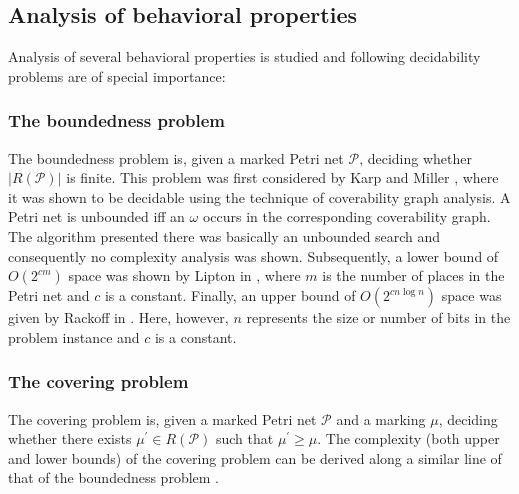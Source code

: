 \subsection{Analysis of behavioral properties} %
\label{sub:analysis_of_behavioral_properties}

Analysis of several behavioral properties is studied and following decidability problems are of special importance:

\subsubsection{The boundedness problem} %
\label{ssub:the_boundedness_problem}
  The boundedness problem is, given a marked Petri net $\mathcal P$, deciding whether $|R(\mathcal P)|$ is finite. This problem was first considered by Karp and Miller \cite{Karp69ParallelProgramSchemata}, where it was shown to be decidable using the technique of coverability graph analysis. A Petri net is unbounded iff an $\omega$ occurs in the corresponding coverability graph. The algorithm presented there was basically an unbounded search and consequently no complexity analysis was shown. Subsequently, a lower bound of $O(2^{cm})$ space was shown by Lipton in \cite{Lipton76Reachability}, where $m$ is the number of places in the Petri net and $c$ is a constant. Finally, an upper bound of $O(2^{cn\log{n}})$ space was given by Rackoff in \cite{Rackoff78Reachability}. Here, however, $n$ represents the size or number of bits in the problem instance and $c$ is a constant.

\subsubsection{The covering problem} %
\label{ssub:the_covering_problem}
  The covering problem is, given a marked Petri net $\mathcal P$ and a marking $\mu$, deciding whether there exists $\mu^\prime\in R(\mathcal P)$ such that $\mu^\prime\geq\mu$. The complexity (both upper and lower bounds) of the covering problem can be derived along a similar line of that of the boundedness problem \cite{Rackoff78Reachability}.

